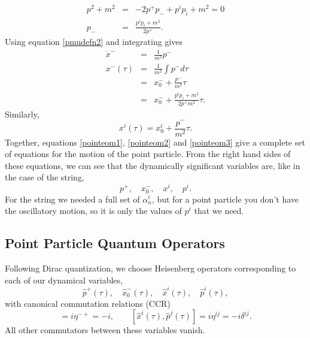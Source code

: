 \documentclass[a4paper,12pt]{article}
\numberwithin{equation}{section}
\begin{document}
\begin{eqnarray}\label{pminusdefn}
p^2 + m^2 &=& -2p^+ p_- + p^i p_i + m^2 = 0\\
p_- &=& \frac{p^i p_i + m^2}{2p^+}.
\end{eqnarray}
Using equation \ref{pmudefn2} and integrating gives
\begin{eqnarray}\label{pointeom2}
\dot{x}^- &=& \frac{1}{m^2} p^- \nonumber\\
x^-(\tau) &=& \frac{1}{m^2}\int p^-d\tau\nonumber\\ 
&=& x_0^- + \frac{p^-}{m^2}\tau\nonumber\\
&=& x_0^- + \frac{p^i p_i + m^2}{2p^+m^2}\tau.
\end{eqnarray}
Similarly, 
\begin{equation}\label{pointeom3}
x^i(\tau) = x_0^i + \frac{p^-}{m^2}\tau.
\end{equation}
Together, equations \ref{pointeom1}, \ref{pointeom2} and \ref{pointeom3} give a complete set of equations for the motion of the point particle. From the right hand sides of these equations, we can see that the dynamically significant variables are, like in the case of the string,
\begin{equation}
p^+, \quad x_0^-, \quad x^i, \quad p^i.
\end{equation}
For the string we needed a full set of $\alpha_n^i$, but for a point particle you don't have the oscillatory motion, so it is only the values of $p^i$ that we need.
\subsection{Point Particle Quantum Operators}
Following Dirac quantization, we choose Heisenberg operators corresponding to each of our dynamical variables,
\begin{equation}
\hat{p}^+(\tau), \quad \hat{x}_0^-(\tau),\quad \hat{x}^i(\tau), \quad \hat{p}^i(\tau),
\end{equation} 
with canonical commutation relations (CCR)
\begin{equation}
[\hat{x}_0^-(\tau),\hat{p}^+(\tau)] = i\eta^{- +} = -i,\quad\quad 
[\hat{x}^i(\tau),\hat{p}^j(\tau)] = i\eta^{i j} = -i\delta^{i j}.
\end{equation}
All other commutators between these variables vanish.
\end{document}
